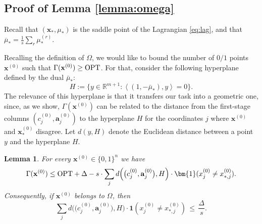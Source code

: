 \documentclass{article}
\newcommand{\red}[1]{{\color{red} #1}}
\newcommand{\R}{\mathbb{R}}
\newcommand{\av}[0]{\mathbf{a}}
\newcommand{\xv}[0]{\mathbf{x}}
\newcommand{\ones}{{\bm{1}}}
\newtheorem{lemma}{Lemma}[section]
\newcommand{\iprod}[2]{\left\langle {#1}, {#2} \right\rangle}
\newcommand{\OPT}{\textup{OPT}}
\begin{document}

\subsection{Proof of Lemma \ref{lemma:omega}}



Recall that $(\xv_*,\mu_*)$ is the saddle point of the Lagrangian \eqref{eq:lag}, and that $\overline{\mu}_* = \frac{1}{s} \sum_r \mu_*^{(r)}$.

Recalling the definition of $\Omega$, we would like to bound the number of $0/1$ points $\xv^{(0)}$ such that $\Gamma(\xv^{(0)}) \ge \OPT$. For that, consider the following hyperplane defined by the dual $\bar{\mu}_*$:
$$H := \{y \in \R^{m+1} : \iprod{(1, -\bar{\mu}_*)}{y} = 0\}.$$
The relevance of this hyperplane is that it transfers our task into a geometric one, since, as we show, $\Gamma(\xv^{(0)})$ can be related to the distance from the first-stage columns $(c^{(0)}_j, \av^{(0)}_j)$ to the hyperplane $H$ for the coordinates $j$ where $\xv^{(0)}$ and $\xv_*^{(0)}$ disagree. Let $d(y,H)$ denote the Euclidean distance between a point $y$ and the hyperplane $H$.

\begin{lemma} \label{lemma:dist}
    For every $\xv^{(0)} \in \{0,1\}^n$ we have
    $$\Gamma(\xv^{(0)}) \le \OPT + \Delta - s \cdot \sum_j d\Big(\big(c^{(0)}_j, \av^{(0)}_j\big), H\Big) \cdot \ones(x^{(0)}_j \neq x^{(0)}_{*,j}).$$
    Consequently, if $\xv^{(0)}$ belongs to $\Omega$, then
    $$\sum_j d\Big(\big(c^{(0)}_j, \av^{(0)}_j\big), H\Big) \cdot \ones(x^{(0)}_j \neq x^{(0)}_{*,j}) \,\le\, \frac{\Delta}{s}.$$
\end{lemma}
\end{document}
